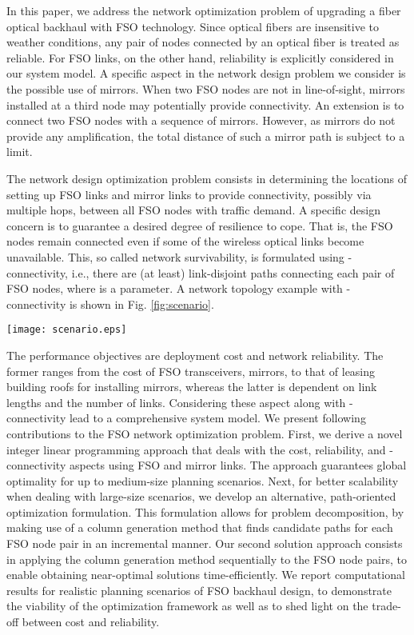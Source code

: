 \documentclass[onecolumn,11pt,draftclsnofoot]{IEEEtran}
\begin{document}
In this paper, we address the network optimization problem of upgrading a fiber optical backhaul with FSO technology. Since optical fibers are insensitive to weather conditions, any pair of nodes connected by an optical fiber is treated as reliable. For FSO links, on the other hand, reliability is explicitly considered in our system model. A specific aspect in the network design problem we consider is the possible use of mirrors. When two FSO nodes are not in line-of-sight, mirrors installed at a third node may potentially provide connectivity. An extension is to connect two FSO nodes with a sequence of mirrors. However, as mirrors do not provide any amplification, the total distance of such a mirror path is subject to a limit.

The network design optimization problem consists in determining the locations of setting up FSO links and mirror links to provide connectivity, possibly via multiple hops, between all FSO nodes with traffic demand. A specific design concern is to guarantee a desired degree of resilience to cope. That is, the FSO nodes remain connected even if some of the wireless optical links become unavailable. This, so called network survivability, is formulated using -connectivity, i.e., there are (at least)  link-disjoint paths connecting each pair of FSO nodes, where  is a parameter. A network topology example with -connectivity is shown in Fig. \ref{fig:scenario}.

\begin{figure*}
\centering
\texttt{[image: scenario.eps]}
\caption{A backhaul network deployment scenario with FSO transceivers, mirrors and fibers}\label{fig:scenario}
\end{figure*}

The performance objectives are deployment cost and network reliability. The former ranges from the cost of FSO transceivers, mirrors, to that of leasing building roofs for installing mirrors, whereas the latter is dependent on link lengths and the number of links. Considering these aspect along with -connectivity lead to a comprehensive system model. We present following contributions to the FSO network optimization problem. First, we derive a novel integer linear programming approach that deals with the cost, reliability, and -connectivity aspects using FSO and mirror links. The approach guarantees global optimality for up to medium-size planning scenarios. Next, for better scalability when dealing with large-size scenarios, we develop an alternative, path-oriented optimization formulation. This formulation allows for problem decomposition, by making use of a column generation method that finds candidate paths for each FSO node pair in an incremental manner. Our second solution approach consists in applying the column generation method sequentially to the FSO node pairs, to enable obtaining near-optimal solutions time-efficiently. We report computational results for realistic planning scenarios of FSO backhaul design, to demonstrate the viability of the optimization framework as well as to shed light on the trade-off between cost and reliability.
\end{document}

